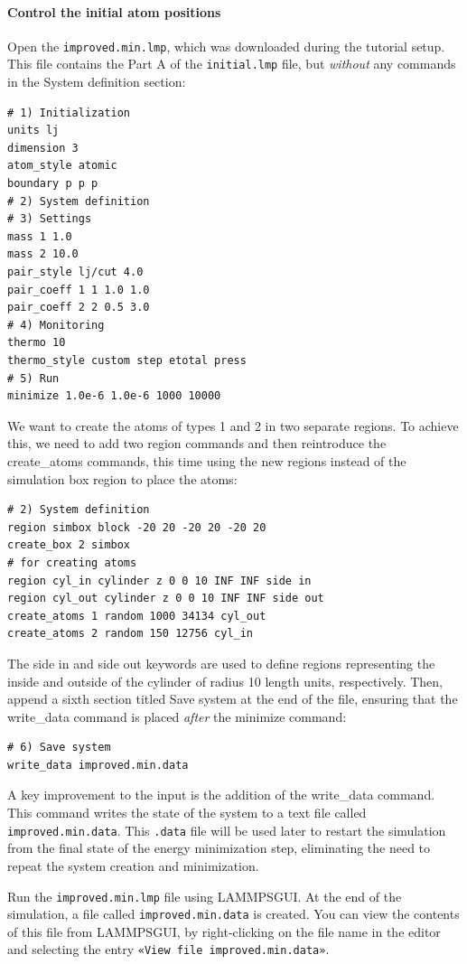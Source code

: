 \documentclass[9pt,tutorial]{livecoms}
\newcommand{\lmpcmd}[1]{\colorbox{listing}{\textcolor{command}{\small{#1}}}} %
\newcommand{\flecmd}[1]{\textcolor{command}{\texttt{#1}}} %
\newcommand{\guicmd}[1]{\textcolor{command}{\texttt{«#1»}}} %
\newcommand{\lammpsgui}{\textsf{LAMMPS\textendash GUI}}
\begin{document}
\paragraph{Control the initial atom positions}

Open the \flecmd{improved.min.lmp}, which was downloaded during the
tutorial setup.  This file contains the \lmpcmd{Part A} of the
\flecmd{initial.lmp} file, but \emph{without} any
commands in the \lmpcmd{System definition} section:
\begin{lstlisting}
# 1) Initialization
units lj
dimension 3
atom_style atomic
boundary p p p
# 2) System definition
# 3) Settings
mass 1 1.0
mass 2 10.0
pair_style lj/cut 4.0
pair_coeff 1 1 1.0 1.0
pair_coeff 2 2 0.5 3.0
# 4) Monitoring
thermo 10
thermo_style custom step etotal press
# 5) Run
minimize 1.0e-6 1.0e-6 1000 10000
\end{lstlisting}
We want to create the atoms of types 1 and 2 in two separate
regions.  To achieve this, we need to add two \lmpcmd{region} commands and then
reintroduce the \lmpcmd{create\_atoms} commands, this time using the new
regions instead of the simulation box region to place the atoms:
\begin{lstlisting}
# 2) System definition
region simbox block -20 20 -20 20 -20 20
create_box 2 simbox
# for creating atoms
region cyl_in cylinder z 0 0 10 INF INF side in
region cyl_out cylinder z 0 0 10 INF INF side out
create_atoms 1 random 1000 34134 cyl_out
create_atoms 2 random 150 12756 cyl_in
\end{lstlisting}
The \lmpcmd{side in} and \lmpcmd{side out} keywords are used to define
regions representing the inside and outside of the cylinder of radius
10 length units, respectively.  Then, append a sixth section titled \lmpcmd{Save system} at the end
of the file, ensuring that the \lmpcmd{write\_data} command is placed \emph{after}
the \lmpcmd{minimize} command:
\begin{lstlisting}
# 6) Save system
write_data improved.min.data
\end{lstlisting}

\begin{note}
  A key improvement to the input is the addition of the
  \lmpcmd{write\_data} command.  This command writes the state of the
  system to a text file called \flecmd{improved.min.data}.  This
  \flecmd{.data} file will be used later to restart the simulation from
  the final state of the energy minimization step, eliminating the need
  to repeat the system creation and minimization.
\end{note}
Run the \flecmd{improved.min.lmp} file using \lammpsgui{}.  At the end
of the simulation, a file called \flecmd{improved.min.data} is created.
You can view the contents of this file from \lammpsgui{}, by
right-clicking on the file name in the editor and selecting the entry
\guicmd{View file improved.min.data}.
\end{document}
